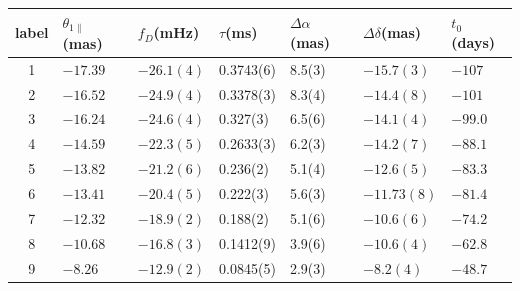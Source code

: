 \documentclass[useAMS,usenatbib]{mn2e}
\begin{document}
\begin{table}
\centering
\begin{tabular}{c|llllll}
\hline
label & $\theta_{1\parallel}$(mas) & $f_D$(mHz) & $\tau$(ms)  & $\Delta\alpha$(mas) & $\Delta\delta$(mas) & $t_0$(days)\\
\hline
1& $-17.39$   & $-26.1(4)$    & 0.3743(6)         & 8.5(3)    & $-15.7(3)$      & $-107$                               \\
2& $-16.52$  & $-24.9(4)$      & 0.3378(3)         & 8.3(4)  & $-14.4(8)$      &$-101$                                \\
3& $-16.24$   & $-24.6(4)$       & 0.327(3)   & 6.5(6)  & $-14.1(4)$       & $-99.0$                                \\
4& $-14.59$   & $-22.3(5)$      & 0.2633(3)    & 6.2(3)  & $-14.2(7)$     & $-88.1$                                \\
5& $-13.82$ & $-21.2(6)$        & 0.236(2)    & 5.1(4)  & $-12.6(5)$      & $-83.3$                                \\
6& $-13.41$ & $-20.4(5)$      & 0.222(3)     & 5.6(3)  & $-11.73(8)$    & $-81.4$                                \\
7& $-12.32$   & $-18.9(2)$      & 0.188(2)   & 5.1(6) & $-10.6(6)$      & $-74.2$                        \\
8& $-10.68$   & $-16.8(3)$      & 0.1412(9)  & 3.9(6) & $-10.6(4)$      & $-62.8$                                \\
9& $-8.26$   & $-12.9(2)$      & 0.0845(5) & 2.9(3)  & $-8.2(4)$      & $-48.7$                                
\\ \hline


\end{tabular}
\end{table}
\end{document}
